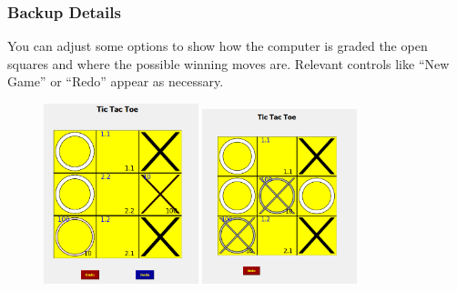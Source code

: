 \documentclass{beamer}
\begin{document}
\begin{frame}
    \frametitle{Backup Details}
    You can adjust some options to show how the computer is graded the open squares and where the possible winning moves are.  Relevant controls like ``New Game'' or ``Redo'' appear as necessary.
    \begin{figure}
        \centering
        \includegraphics[width=0.4\textwidth]{TicTacToe_Best_moves1.png} \quad%
        \includegraphics[width=0.4\textwidth]{TicTacToe_Best_moves2.png}
    \end{figure}
\end{frame}
\end{document}
